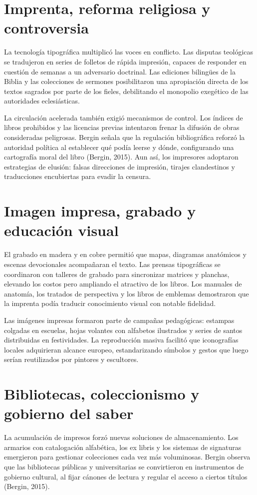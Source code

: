 \section{Imprenta, reforma religiosa y controversia}
La tecnología tipográfica multiplicó las voces en conflicto. Las disputas teológicas se tradujeron en series de folletos de rápida impresión, capaces de responder en cuestión de semanas a un adversario doctrinal. Las ediciones bilingües de la Biblia y las colecciones de sermones posibilitaron una apropiación directa de los textos sagrados por parte de los fieles, debilitando el monopolio exegético de las autoridades eclesiásticas.

La circulación acelerada también exigió mecanismos de control. Los índices de libros prohibidos y las licencias previas intentaron frenar la difusión de obras consideradas peligrosas. Bergin señala que la regulación bibliográfica reforzó la autoridad política al establecer qué podía leerse y dónde, configurando una cartografía moral del libro (Bergin, 2015). Aun así, los impresores adoptaron estrategias de elusión: falsas direcciones de impresión, tirajes clandestinos y traducciones encubiertas para evadir la censura.

\section{Imagen impresa, grabado y educación visual}
El grabado en madera y en cobre permitió que mapas, diagramas anatómicos y escenas devocionales acompañaran el texto. Las prensas tipográficas se coordinaron con talleres de grabado para sincronizar matrices y planchas, elevando los costos pero ampliando el atractivo de los libros. Los manuales de anatomía, los tratados de perspectiva y los libros de emblemas demostraron que la imprenta podía traducir conocimiento visual con notable fidelidad.

Las imágenes impresas formaron parte de campañas pedagógicas: estampas colgadas en escuelas, hojas volantes con alfabetos ilustrados y series de santos distribuidas en festividades. La reproducción masiva facilitó que iconografías locales adquirieran alcance europeo, estandarizando símbolos y gestos que luego serían reutilizados por pintores y escultores.

\section{Bibliotecas, coleccionismo y gobierno del saber}
La acumulación de impresos forzó nuevas soluciones de almacenamiento. Los armarios con catalogación alfabética, los ex libris y los sistemas de signaturas emergieron para gestionar colecciones cada vez más voluminosas. Bergin observa que las bibliotecas públicas y universitarias se convirtieron en instrumentos de gobierno cultural, al fijar cánones de lectura y regular el acceso a ciertos títulos (Bergin, 2015).

